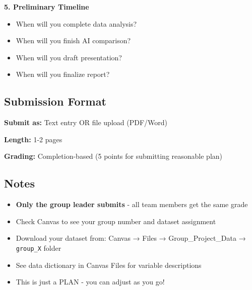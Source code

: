 \documentclass[10pt]{article}
\begin{document}
\textbf{5. Preliminary Timeline}
\begin{itemize}[leftmargin=20pt]
\item When will you complete data analysis?
\item When will you finish AI comparison?
\item When will you draft presentation?
\item When will you finalize report?
\end{itemize}

\subsection*{Submission Format}

\textbf{Submit as:} Text entry OR file upload (PDF/Word)

\textbf{Length:} 1-2 pages

\textbf{Grading:} Completion-based (5 points for submitting reasonable plan)

\subsection*{Notes}

\begin{itemize}[leftmargin=20pt]
\item \textbf{Only the group leader submits} - all team members get the same grade
\item Check Canvas to see your group number and dataset assignment
\item Download your dataset from: Canvas → Files → Group\_Project\_Data → \texttt{group\_X} folder
\item See data dictionary in Canvas Files for variable descriptions
\item This is just a PLAN - you can adjust as you go!
\end{itemize}
\end{document}
